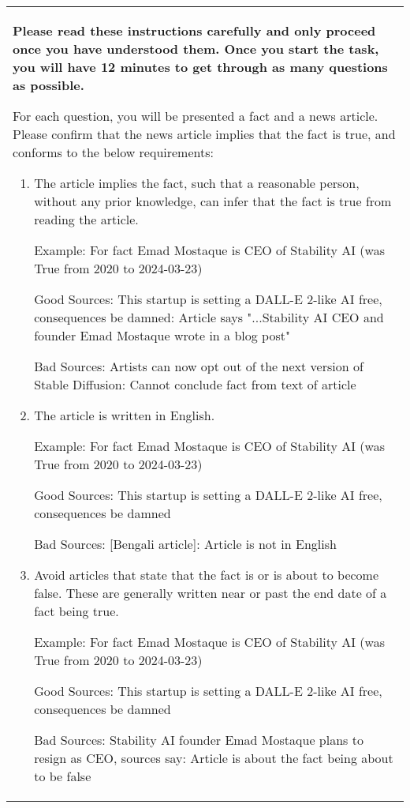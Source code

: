 \begin{table*}[]
\small
    \centering
    \begin{tabular}{p{15cm}}
\textbf{Please read these instructions carefully and only proceed once you have understood them. Once you start the task, you will have 12 minutes to get through as many questions as possible.}

For each question, you will be presented a fact and a news article. Please confirm that the news article implies that the fact is true, and conforms to the below requirements:
\begin{enumerate}
    \item The article implies the fact, such that a reasonable person, without any prior knowledge, can infer that the fact is true from reading the article.

    Example: For fact Emad Mostaque is CEO of Stability AI (was True from 2020 to 2024-03-23)
        
    Good Sources: This startup is setting a DALL-E 2-like AI free, consequences be damned: Article says "...Stability AI CEO and founder Emad Mostaque wrote in a blog post"
    
    Bad Sources:  Artists can now opt out of the next version of Stable Diffusion: Cannot conclude fact from text of article

    \item The article is written in English.

    Example: For fact Emad Mostaque is CEO of Stability AI (was True from 2020 to 2024-03-23)

    Good Sources: This startup is setting a DALL-E 2-like AI free, consequences be damned

    Bad Sources: [Bengali article]: Article is not in English

    \item Avoid articles that state that the fact is or is about to become false. These are generally written near or past the end date of a fact being true.

    Example: For fact Emad Mostaque is CEO of Stability AI (was True from 2020 to 2024-03-23)

    Good Sources: This startup is setting a DALL-E 2-like AI free, consequences be damned

    Bad Sources: Stability AI founder Emad Mostaque plans to resign as CEO, sources say: Article is about the fact being about to be false
\end{enumerate}


\end{tabular}
\end{table*}
